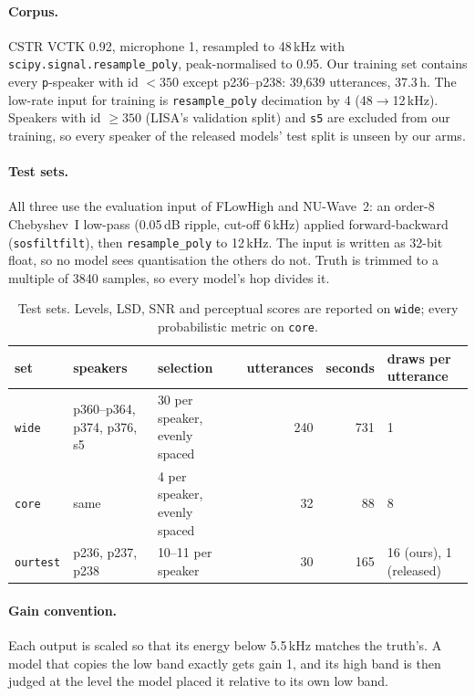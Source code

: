 \documentclass[10pt,letterpaper]{article}
\begin{document}
\paragraph{Corpus.} CSTR VCTK 0.92, microphone 1, resampled to 48\,kHz with \texttt{scipy.signal.resample\_poly},
peak-normalised to 0.95. Our training set contains every \texttt{p}-speaker with id $<350$ except p236--p238:
39{,}639 utterances, 37.3\,h. The low-rate input for training is \texttt{resample\_poly} decimation by 4
(48$\to$12\,kHz). Speakers with id $\ge 350$ (LISA's validation split) and \texttt{s5} are excluded from our
training, so every speaker of the released models' test split is unseen by our arms.

\paragraph{Test sets.} All three use the evaluation input of FLowHigh and NU-Wave~2: an order-8 Chebyshev~I
low-pass (0.05\,dB ripple, cut-off 6\,kHz) applied forward-backward (\texttt{sosfiltfilt}), then
\texttt{resample\_poly} to 12\,kHz. The input is written as 32-bit float, so no model sees quantisation the
others do not. Truth is trimmed to a multiple of 3840 samples, so every model's hop divides it.

\begin{table}[H]\small\centering
\begin{tabular}{lllrrl}
\toprule
set & speakers & selection & utterances & seconds & draws per utterance \\
\midrule
\texttt{wide} & p360--p364, p374, p376, s5 & 30 per speaker, evenly spaced & 240 & 731 & 1 \\
\texttt{core} & same & 4 per speaker, evenly spaced & 32 & 88 & 8 \\
\texttt{ourtest} & p236, p237, p238 & 10--11 per speaker & 30 & 165 & 16 (ours), 1 (released) \\
\bottomrule
\end{tabular}
\caption{Test sets. Levels, LSD, SNR and perceptual scores are reported on \texttt{wide}; every probabilistic
metric on \texttt{core}.}
\end{table}

\paragraph{Gain convention.} Each output is scaled so that its energy below 5.5\,kHz matches the truth's.
A model that copies the low band exactly gets gain 1, and its high band is then judged at the level the model
placed it relative to its own low band.
\end{document}

